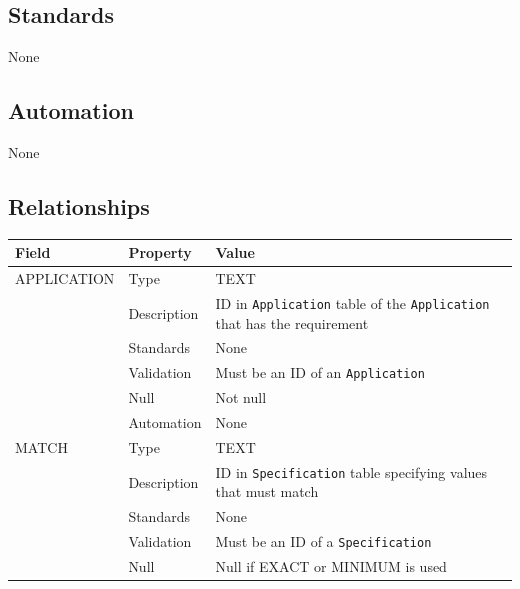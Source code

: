 \documentclass[
]{article}
\newcounter{none}
\begin{document}
\subsection{Standards}\label{standards-28}

None

\subsection{Automation}\label{automation-28}

None

\subsection{Relationships}\label{relationships-23}

{\def\LTcaptype{none} 
\begin{longtable}[]{@{}
  >{\raggedright\arraybackslash}p{}
  >{\raggedright\arraybackslash}p{}
  >{\raggedright\arraybackslash}p{}@{}}
\toprule\noalign{}
\begin{minipage}[b]{\linewidth}\raggedright
Field
\end{minipage} & \begin{minipage}[b]{\linewidth}\raggedright
Property
\end{minipage} & \begin{minipage}[b]{\linewidth}\raggedright
Value
\end{minipage} \\
\midrule\noalign{}
\endhead
\bottomrule\noalign{}
\endlastfoot
APPLICATION & Type & TEXT \\
& Description & ID in \texttt{Application} table of the
\texttt{Application} that has the requirement \\
& Standards & None \\
& Validation & Must be an ID of an \texttt{Application} \\
& Null & Not null \\
& Automation & None \\
MATCH & Type & TEXT \\
& Description & ID in \texttt{Specification} table specifying values
that must match \\
& Standards & None \\
& Validation & Must be an ID of a \texttt{Specification} \\
& Null & Null if EXACT or MINIMUM is used \\

\end{longtable}}
\end{document}
